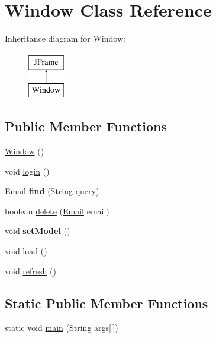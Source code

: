 \hypertarget{class_window}{}\section{Window Class Reference}
\label{class_window}
Inheritance diagram for Window\+:\begin{figure}[H]
\begin{center}
\leavevmode
\includegraphics[height=2.000000cm]{class_window}
\end{center}
\end{figure}
\subsection*{Public Member Functions}
\begin{DoxyCompactItemize}
\item 
\hyperlink{class_window_ad0552903a3d5b009c0d882f9ad2571ff}{Window} ()
\item 
void \hyperlink{class_window_a0e9b9530fdbae1642ce5f2295160e1af}{login} ()
\item 
\mbox{\label{class_window_a487c2744165f9a1d1713a8396ccd3eb1}} 
\hyperlink{class_email}{Email} {\bfseries find} (String query)
\item 
boolean \hyperlink{class_window_a483632edb0590ebb925da330fd422e2f}{delete} (\hyperlink{class_email}{Email} email)
\item 
\mbox{\label{class_window_a94fab70145669e0c370c1cd40f9373e3}} 
void {\bfseries set\+Model} ()
\item 
void \hyperlink{class_window_ab76a4c258774324cbd2559a912c8d89b}{load} ()
\item 
void \hyperlink{class_window_ae0c2bf00a564beb8f03ee2ae97a4feb5}{refresh} ()
\end{DoxyCompactItemize}
\subsection*{Static Public Member Functions}
\begin{DoxyCompactItemize}
\item 
static void \hyperlink{class_window_a95602e95a687fa2069944650a01d780e}{main} (String args\mbox{[}$\,$\mbox{]})
\end{DoxyCompactItemize}


